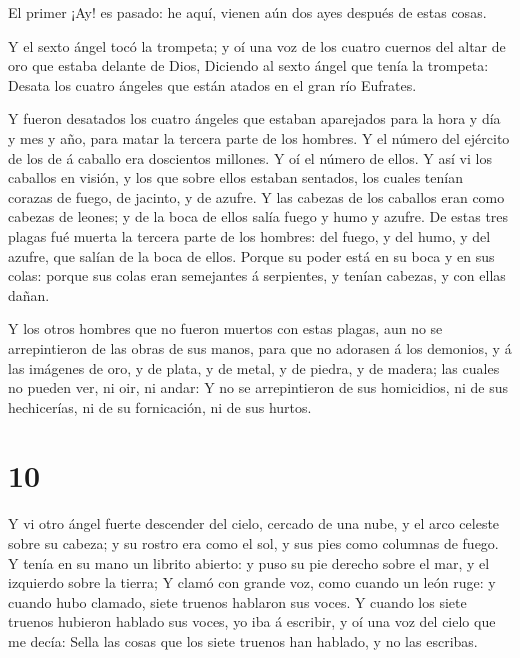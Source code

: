 El primer ¡Ay! es pasado: he aquí, vienen aún dos ayes
después de estas cosas.

 Y el sexto ángel tocó la trompeta; y oí una voz de los
cuatro cuernos del altar de oro que estaba delante de Dios,
 Diciendo al sexto ángel que tenía la trompeta: Desata los
cuatro ángeles que están atados en el gran río Eufrates.

 Y fueron desatados los cuatro ángeles que estaban
aparejados para la hora y día y mes y año, para matar la tercera parte
de los hombres.  Y el número del ejército de los de á
caballo era doscientos millones. Y oí el número de ellos. 
Y así vi los caballos en visión, y los que sobre ellos estaban sentados,
los cuales tenían corazas de fuego, de jacinto, y de azufre. Y las
cabezas de los caballos eran como cabezas de leones; y de la boca de
ellos salía fuego y humo y azufre.  De estas tres plagas
fué muerta la tercera parte de los hombres: del fuego, y del humo, y del
azufre, que salían de la boca de ellos.  Porque su poder
está en su boca y en sus colas: porque sus colas eran semejantes á
serpientes, y tenían cabezas, y con ellas dañan.

 Y los otros hombres que no fueron muertos con estas
plagas, aun no se arrepintieron de las obras de sus manos, para que no
adorasen á los demonios, y á las imágenes de oro, y de plata, y de
metal, y de piedra, y de madera; las cuales no pueden ver, ni oir, ni
andar:  Y no se arrepintieron de sus homicidios, ni de sus
hechicerías, ni de su fornicación, ni de sus hurtos.

\hypertarget{section-9}{%
\section{10}\label{section-9}}

 Y vi otro ángel fuerte descender del cielo, cercado de una
nube, y el arco celeste sobre su cabeza; y su rostro era como el sol, y
sus pies como columnas de fuego.  Y tenía en su mano un
librito abierto: y puso su pie derecho sobre el mar, y el izquierdo
sobre la tierra;  Y clamó con grande voz, como cuando un
león ruge: y cuando hubo clamado, siete truenos hablaron sus voces.
 Y cuando los siete truenos hubieron hablado sus voces, yo
iba á escribir, y oí una voz del cielo que me decía: Sella las cosas que
los siete truenos han hablado, y no las escribas.

